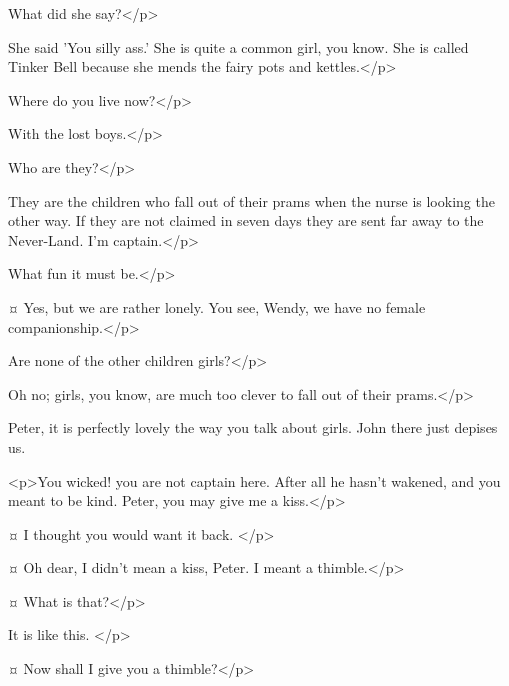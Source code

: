 \begin{drama}

\wendyspeaks
What did she say?</p>

\peterspeaks
She said 'You silly ass.'
She is quite a common girl, you know.
She is called Tinker Bell because she mends the fairy pots and kettles.</p>


\wendyspeaks
Where do you live now?</p>

\peterspeaks
With the lost boys.</p>

\wendyspeaks
Who are they?</p>

\peterspeaks
They are the children who fall out of their prams when the nurse is looking the other way.
If they are not claimed in seven days they are sent far away to the Never-Land.
I'm captain.</p>

\wendyspeaks
What fun it must be.</p>

\peterspeaks {}¤
Yes, but we are rather lonely.
You see, Wendy, we have no female companionship.</p>

\wendyspeaks
Are none of the other children girls?</p>

\peterspeaks
Oh no; girls, you know, are much too clever to fall out of their prams.</p>

\wendyspeaks
Peter, it is perfectly lovely the way you talk about girls.
John there just depises us.


<p>You wicked!
you are not captain here.
After all he hasn't wakened, and you meant to be kind.
Peter, you may give me a kiss.</p>

\peterspeaks {}¤
I thought you would want it back.
</p>

\wendyspeaks {}¤
Oh dear, I didn't mean a kiss, Peter.
I meant a thimble.</p>

\peterspeaks {}¤
What is that?</p>

\wendyspeaks
It is like this.
</p>

\peterspeaks {}¤
Now shall I give you a thimble?</p>


\end{drama}
